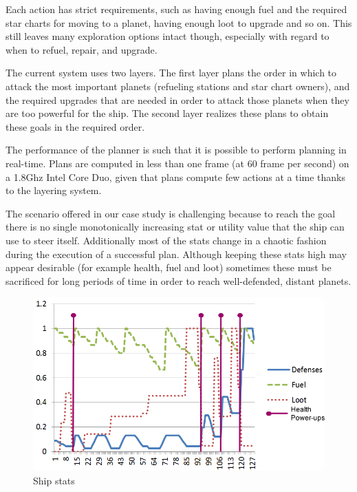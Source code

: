 Each action has strict requirements, such as having enough fuel and the required star charts for moving to a planet, having enough loot to upgrade and so on. This still leaves many exploration options intact though, especially with regard to when to refuel, repair, and upgrade.

The current system uses two layers. The first layer plans the order in which to attack the most important planets (refueling stations and star chart owners), and the required upgrades that are needed in order to attack those planets when they are too powerful for the ship. The second layer realizes these plans to obtain these goals in the required order.

The performance of the planner is such that it is possible to perform planning in real-time. Plans are computed in less than one frame (at 60 frame per second) on a 1.8Ghz Intel Core Duo, given that plans compute few actions at a time thanks to the layering system.

The scenario offered in our case study is challenging because to reach the goal there is no single monotonically increasing stat or utility value that the ship can use to steer itself. Additionally most of the stats change in a chaotic fashion during the execution of a successful plan. Although keeping these stats high may appear desirable (for example health, fuel and loot) sometimes these must be sacrificed for long periods of time in order to reach well-defended, distant planets.
  
\begin{figure}
\begin{center}
\includegraphics[scale=0.3]{Pics/graph1-stats.png}
\end{center}
\caption{Ship stats}
\label{fig:graph1-stats}
\end{figure}  

